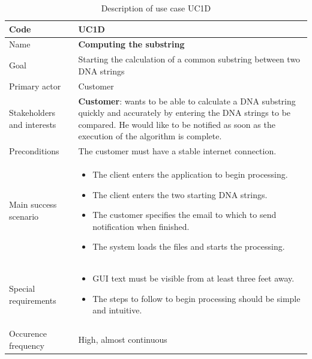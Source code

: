 \documentclass[a4paper,10pt, titlepage]{article}
\begin{document}
\begin{table}
	\centering
\begin{tabular}{ | m{3.5cm} | m{11cm} |}
	\hline
	\rowcolor{lightgray}
	Code & \textbf{UC1D} \\
	\hline
	Name & \textbf{Computing the substring} \\
	\hline
	\rowcolor{lightgray}
	Goal & Starting the calculation of a common substring between two DNA strings\\
	\hline
	Primary actor & Customer \\
	\hline
	\rowcolor{lightgray}
	Stakeholders and interests & \textbf{Customer}: wants to be able to calculate a DNA substring quickly and accurately by entering the DNA strings to be compared. He would like to be notified as soon as the execution of the algorithm is complete.\\
	\hline
	Preconditions & The customer must have a stable internet connection.\\
	\hline
	\rowcolor{lightgray}
	Main success scenario & 
	\begin{itemize}
		\item The client enters the application to begin processing.
		\item The client enters the two starting DNA strings.
		\item The customer specifies the email to which to send notification when finished.
		\item The system loads the files and starts the processing.
	\end{itemize}\\
	\hline
	Special requirements & 
	\begin{itemize}
		\item GUI text must be visible from at least three feet away.
		\item The steps to follow to begin processing should be simple and intuitive.
	\end{itemize}\\
	\rowcolor{lightgray}
	\hline
	Occurence frequency & High, almost continuous\\
	\hline
  \end{tabular}
  \caption{\label{tab:uc1d-table}Description of use case UC1D}
  \end{table}
\end{document}

